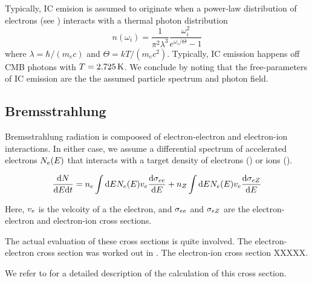 Typically, \ac{IC} emision is assumed to originate when
a power-law distribution of electrons
(see )
interacts with
a thermal photon distribution
\begin{equation}
  n(\omega_i) = 
  \frac{1}{\pi^2\lambda^3} 
  \frac{\omega_i^2}{e^{\omega_i/\Theta} -1}
\end{equation}
where $\lambda=\hbar/(m_e c)$ and $\Theta=kT/(m_e c^2)$.
Typically, \ac{IC} emission happens off CMB photons
with $T=2.725\,\text{K}$.
We conclude by noting that the free-parameters of 
\ac{IC} emission are the the assumed particle spectrum
and photon field.

\subsection{Bremsstrahlung}

Bremsstrahlung radiation is compoosed of electron-electron and electron-ion interactions.
In either case, 
we assume a 
differential spectrum of accelerated electrons $N_e(E)$ 
that interacts with a target density of electrons (\ElectronDensity) or ions (\IonDensity).

\begin{equation}
  \frac{\text{d} N}{\text{d}E\text{d}t} =
  n_e \int \text{d}E
  N_e(E) v_e
  \frac{\text{d}\sigma_{ee}}{\text{d}E} +
  n_Z \int \text{d}E
  N_e(E) v_e
  \frac{\text{d}\sigma_{eZ}}{\text{d}E}
\end{equation}

Here, $v_e$ is the velcoity of a the electron,
and $\sigma_{ee}$ and $\sigma_{eZ}$
are the electron-electron and electron-ion cross sections.

The actual evaluation of these cross sections is quite involved.
The electron-electron cross section was worked out in \cite{haug_1975a_bremsstrahlung-production}.
The electron-ion cross section XXXXX.

We refer to \cite{houck_2006a_models-nonthermal} for a detailed
description of the calculation of this cross section.


